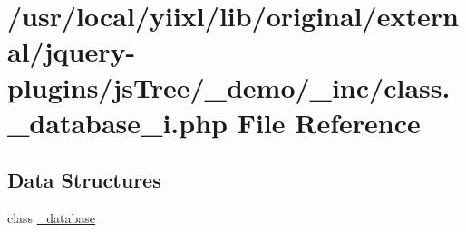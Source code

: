 \hypertarget{class_8__database__i_8php}{
\section{/usr/local/yiixl/lib/original/external/jquery-\/plugins/jsTree/\_\-demo/\_\-inc/class.\_\-database\_\-i.php File Reference}
\label{class_8__database__i_8php}
}
\subsection*{Data Structures}
\begin{DoxyCompactItemize}
\item 
class \hyperlink{class__database}{\_\-database}
\end{DoxyCompactItemize}
